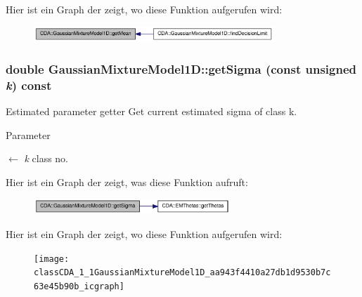 Hier ist ein Graph der zeigt, wo diese Funktion aufgerufen wird:\nopagebreak
\begin{figure}[H]
\begin{center}
\leavevmode
\includegraphics[width=256pt]{classCDA_1_1GaussianMixtureModel1D_abd992452517cd8f0efc8f5408f898e33_icgraph}
\end{center}
\end{figure}


\hypertarget{classCDA_1_1GaussianMixtureModel1D_aa943f4410a27db1d9530b7c63e45b90b}{
\subsubsection[{getSigma}]{\setlength{\rightskip}{0pt plus 5cm}double GaussianMixtureModel1D::getSigma (const unsigned {\em k}) const}}
\label{classCDA_1_1GaussianMixtureModel1D_aa943f4410a27db1d9530b7c63e45b90b}


Estimated parameter getter Get current estimated sigma of class k. 


\begin{DoxyParams}{Parameter}
\item[\mbox{$\leftarrow$} {\em k}]class no. \end{DoxyParams}


Hier ist ein Graph der zeigt, was diese Funktion aufruft:\nopagebreak
\begin{figure}[H]
\begin{center}
\leavevmode
\includegraphics[width=209pt]{classCDA_1_1GaussianMixtureModel1D_aa943f4410a27db1d9530b7c63e45b90b_cgraph}
\end{center}
\end{figure}




Hier ist ein Graph der zeigt, wo diese Funktion aufgerufen wird:\nopagebreak
\begin{figure}[H]
\begin{center}
\leavevmode
\texttt{[image: classCDA\_1\_1GaussianMixtureModel1D\_aa943f4410a27db1d9530b7c63e45b90b\_icgraph]}
\end{center}
\end{figure}


